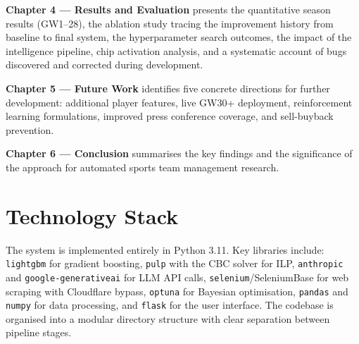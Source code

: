 \textbf{Chapter 4 — Results and Evaluation} presents the quantitative season results (GW1--28), the ablation study tracing the improvement history from baseline to final system, the hyperparameter search outcomes, the impact of the intelligence pipeline, chip activation analysis, and a systematic account of bugs discovered and corrected during development.

\textbf{Chapter 5 — Future Work} identifies five concrete directions for further development: additional player features, live GW30+ deployment, reinforcement learning formulations, improved press conference coverage, and sell-buyback prevention.

\textbf{Chapter 6 — Conclusion} summarises the key findings and the significance of the approach for automated sports team management research.

\section{Technology Stack}

The system is implemented entirely in Python 3.11. Key libraries include: \texttt{lightgbm} for gradient boosting, \texttt{pulp} with the CBC solver for ILP, \texttt{anthropic} and \texttt{google-generativeai} for LLM API calls, \texttt{selenium}/SeleniumBase for web scraping with Cloudflare bypass, \texttt{optuna} for Bayesian optimisation, \texttt{pandas} and \texttt{numpy} for data processing, and \texttt{flask} for the user interface. The codebase is organised into a modular directory structure with clear separation between pipeline stages.
